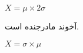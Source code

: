 \begin{probnum}{1}
	
	\raggedright
	$X = \mu \times 2\sigma$
	
	\raggedleft
	آخوند مادرجنده است.
	
	\raggedright
	$X = \sigma \times \mu$
	
\end{probnum}